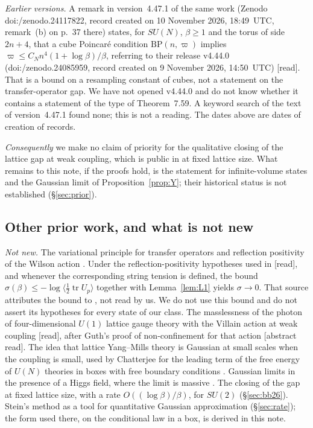 \documentclass[11pt,a4paper]{article}
\theoremstyle{plain}
\theoremstyle{definition}
\theoremstyle{remark}
\numberwithin{equation}{section}
\newcommand{\tr}{\operatorname{tr}}
\newcommand{\st}[1]{\textsf{[#1]}}
\begin{document}
\begingroup\sloppy\emph{Earlier versions.} A remark in version~4.47.1\allowbreak{} of the same work (Zenodo doi:/\allowbreak zenodo.24117822, record created on 10 November 2026, 18:49~UTC, remark~(b) on p.~37 there)
states, for $SU(N)$, $\beta\ge1$ and the torus of side $2n+4$, that a cube Poincar\'e condition $\mathrm{BP}(n,\varpi)$ implies $\varpi\le C_Nn^4(1+\log\beta)/\beta$, referring to their release v4.44.0 
(doi:/\allowbreak zenodo.24085959, record created on 9 November 2026, 14:50~UTC) \st{read}. That is a bound on a resampling constant of cubes, not a statement on the transfer-operator gap.
We have not opened v4.44.0 and do not know whether it contains a statement of the type of Theorem~7.59. A keyword search of the text of version~4.47.1 found none; this is not a reading.
The dates above are dates of creation of records.\endgroup

\emph{Consequently} we make no claim of priority for the qualitative closing of the lattice gap at weak coupling, which is public in \cite{BB26} at fixed lattice size. What remains to
this note, if the proofs hold, is the statement for infinite-volume states and the Gaussian limit of Proposition~\ref{prop:Y}; their historical status is not established (\S\ref{sec:prior}).

\subsection{Other prior work, and what is not new}
\emph{Not new.} The variational principle for transfer operators and reflection positivity of the Wilson action
\cite{OS78,Lus77}. Under the reflection-positivity hypotheses used in \cite[App.~A, (A1.3)--(A1.4)]{TY85} \st{read}, and whenever the
corresponding string tension is defined, the bound $\sigma(\beta)\le-\log\langle\frac12\tr U_p\rangle$ together with Lemma~\ref{lem:L1}
yields $\sigma\to0$. That source attributes the bound to \cite{Sei78}, not read by us. We do not use this bound and do not assert its
hypotheses for every state of our class. The masslessness of the photon of four-dimensional $U(1)$ lattice gauge theory with the Villain action at weak coupling
\cite[\S2.11]{FS82} \st{read}, after Guth's proof of non-confinement for that action \cite{Gut80} \st{abstract read}. The idea that lattice
Yang--Mills theory is Gaussian at small scales when the coupling is small, used by Chatterjee for the leading term of the free energy of
$U(N)$ theories in boxes with free boundary conditions \cite{Cha16}. Gaussian limits in the presence of a Higgs field, where the limit is
massive \cite{Cha24,RYZ26}. The closing of the gap at fixed lattice size, with a rate $O((\log\beta)/\beta)$, for $SU(2)$ \cite[Thm.~7.59]{BB26} (\S\ref{sec:bb26}).
Stein's method as a tool for quantitative Gaussian approximation (\S\ref{sec:rate}); the form used there, on the conditional law in a box, is derived in this note.
\end{document}
